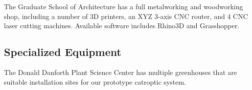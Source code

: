 \documentclass[11pt]{article}
\begin{document}
\vspace{0.1in}
\noindent
The Graduate School of Architecture has a full metalworking and woodworking
shop, including a number of 3D printers, an XYZ 3-axis CNC router,
and 4 CNC laser cutting machines.  Available software
includes Rhino3D and Grasshopper.

\subsection*{Specialized Equipment}

The Donald Danforth Plant Science Center has multiple greenhouses that
are suitable installation sites for our prototype catroptic system.
\end{document}
